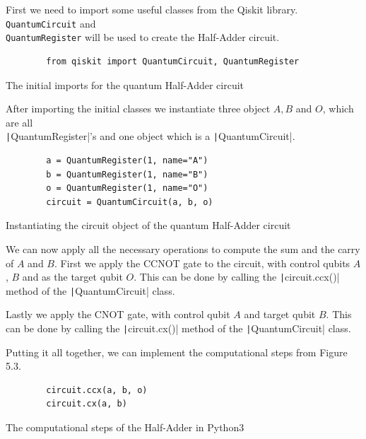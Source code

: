 First we need to import some useful classes from the Qiskit library. \texttt{QuantumCircuit} and \\
\texttt{QuantumRegister} will be used to create the Half-Adder circuit.

\begin{listing}[ht]
    \centering
    \begin{verbatim}
        from qiskit import QuantumCircuit, QuantumRegister
    \end{verbatim}
    \caption{The initial imports for the quantum Half-Adder circuit}
\end{listing}


After importing the initial classes we instantiate three object $A, B$ and $O$, which are all \\\texttt|QuantumRegister|'s and
one object which is a \texttt|QuantumCircuit|.

\begin{listing}[ht]
    \centering
    \begin{verbatim}
        a = QuantumRegister(1, name="A")
        b = QuantumRegister(1, name="B")
        o = QuantumRegister(1, name="O")
        circuit = QuantumCircuit(a, b, o)
    \end{verbatim}
    \caption{Instantiating the circuit object of the quantum Half-Adder circuit}
\end{listing}

We can now apply all the necessary operations to compute the sum and the carry of $A$ and $B$. First we apply the CCNOT gate to the circuit,
with control qubits $A$, $B$ and as the target qubit $O$. This can be done by calling the \texttt|circuit.ccx()| method of the
\texttt|QuantumCircuit| class.

Lastly we apply the CNOT gate, with control qubit $A$ and target qubit $B$. This can be done by calling the \texttt|circuit.cx()|
method of the \texttt|QuantumCircuit| class.

Putting it all together, we can implement the computational steps from Figure 5.3.

\begin{listing}[ht]
    \centering
    \begin{verbatim}
        circuit.ccx(a, b, o)
        circuit.cx(a, b)
    \end{verbatim}
    \caption{The computational steps of the Half-Adder in Python3}
\end{listing}